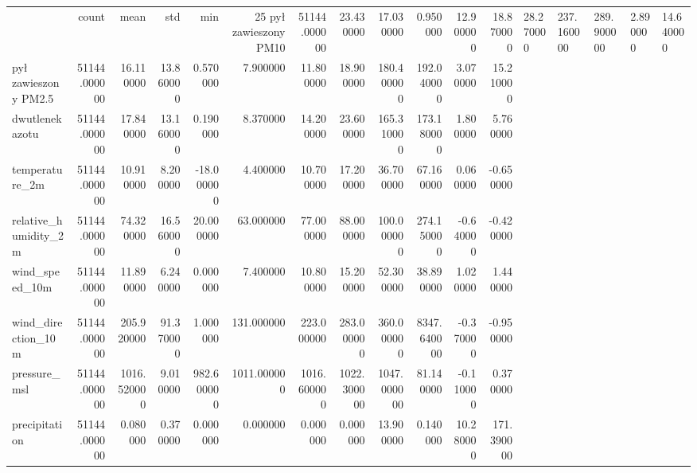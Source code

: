 \begin{tabular}{lrrrrrrrrrrr}
\toprule
 & count & mean & std & min & 25%
\midrule
pył zawieszony PM10 & 51144.000000 & 23.430000 & 17.030000 & 0.950000 & 12.900000 & 18.870000 & 28.270000 & 237.160000 & 289.900000 & 2.890000 & 14.640000 \\
pył zawieszony PM2.5 & 51144.000000 & 16.110000 & 13.860000 & 0.570000 & 7.900000 & 11.800000 & 18.900000 & 180.400000 & 192.040000 & 3.070000 & 15.210000 \\
dwutlenek azotu & 51144.000000 & 17.840000 & 13.160000 & 0.190000 & 8.370000 & 14.200000 & 23.600000 & 165.310000 & 173.180000 & 1.800000 & 5.760000 \\
temperature_2m & 51144.000000 & 10.910000 & 8.200000 & -18.000000 & 4.400000 & 10.700000 & 17.200000 & 36.700000 & 67.160000 & 0.060000 & -0.650000 \\
relative_humidity_2m & 51144.000000 & 74.320000 & 16.560000 & 20.000000 & 63.000000 & 77.000000 & 88.000000 & 100.000000 & 274.150000 & -0.640000 & -0.420000 \\
wind_speed_10m & 51144.000000 & 11.890000 & 6.240000 & 0.000000 & 7.400000 & 10.800000 & 15.200000 & 52.300000 & 38.890000 & 1.020000 & 1.440000 \\
wind_direction_10m & 51144.000000 & 205.920000 & 91.370000 & 1.000000 & 131.000000 & 223.000000 & 283.000000 & 360.000000 & 8347.640000 & -0.370000 & -0.950000 \\
pressure_msl & 51144.000000 & 1016.520000 & 9.010000 & 982.600000 & 1011.000000 & 1016.600000 & 1022.300000 & 1047.000000 & 81.140000 & -0.110000 & 0.370000 \\
precipitation & 51144.000000 & 0.080000 & 0.370000 & 0.000000 & 0.000000 & 0.000000 & 0.000000 & 13.900000 & 0.140000 & 10.280000 & 171.390000 \\
\bottomrule
\end{tabular}

